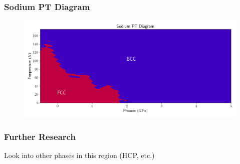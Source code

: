 \documentclass{beamer}
\begin{document}
\begin{frame}
	\frametitle{Sodium PT Diagram}
	\begin{figure}[ht]
	\begin{center}
		\includegraphics[height=2in]{sodium_pt_diagram.png}
	\end{center}
	\end{figure}
\end{frame}

\begin{frame}
	\frametitle{}
\end{frame}

\begin{frame}
	\frametitle{Further Research}
	Look into other phases in this region (HCP, etc.)
\end{frame}
\end{document}
